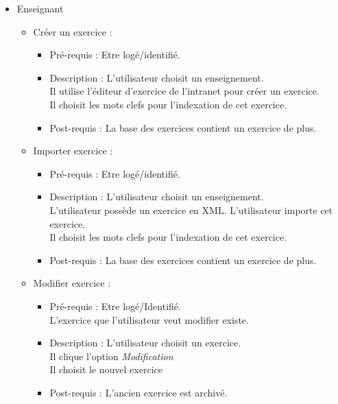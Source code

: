 	\begin{itemize}
	\item Enseignant
		\begin{itemize}
		\item Cr{\'e}er un exercice : 
			\begin{itemize}
			\item Pr{\'e}-requis : Etre log{\'e}/identifi{\'e}.
			\item Description : L'utilisateur choisit un enseignement.\\
			Il utilise l'{\'e}diteur d'exercice de l'intranet pour cr{\'e}er un exercice.\\
			Il choisit les mots clefs pour l'indexation de cet exercice.
			\item Post-requis : La base des exercices contient un exercice de plus. 
			\end{itemize}

		\item Importer exercice : 
			\begin{itemize}
			\item Pr{\'e}-requis : Etre log{\'e}/identifi{\'e}.
			\item Description : L'utilisateur choisit un enseignement.\\
			L'utilisateur poss{\`e}de un exercice en XML.
			L'utilisateur importe cet exercice.\\
			Il choisit les mots clefs pour l'indexation de cet exercice.
			\item Post-requis : La base des exercices contient un exercice de plus. 
			\end{itemize}

		\item Modifier exercice :
		 	\begin{itemize}
			\item Pr{\'e}-requis : Etre log{\'e}/Identifi{\'e}.\\
			L'exercice que l'utilisateur veut modifier existe.
			\item Description : L'utilisateur choisit un exercice.\\
			Il clique l'option {\it Modification}\\
			Il choisit le nouvel exercice 
			\item Post-requis : L'ancien exercice est archiv{\'e}.
			\end{itemize}


\end{itemize}
\end{itemize}
